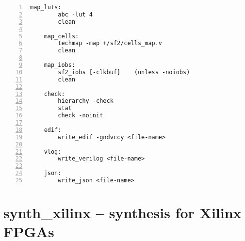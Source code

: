 \begin{lstlisting}[numbers=left,frame=single]
    map_luts:
        abc -lut 4
        clean

    map_cells:
        techmap -map +/sf2/cells_map.v
        clean

    map_iobs:
        sf2_iobs [-clkbuf]    (unless -noiobs)
        clean

    check:
        hierarchy -check
        stat
        check -noinit

    edif:
        write_edif -gndvccy <file-name>

    vlog:
        write_verilog <file-name>

    json:
        write_json <file-name>
\end{lstlisting}

\section{synth\_xilinx -- synthesis for Xilinx FPGAs}
\label{cmd:synth_xilinx}
